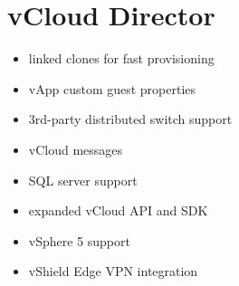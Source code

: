 \section{vCloud Director}

\begin{itemize}

\item linked clones for fast provisioning
\item vApp custom guest properties
\item 3rd-party distributed switch support
\item vCloud messages
\item SQL server support
\item expanded vCloud API and SDK
\item vSphere 5 support
\item vShield Edge VPN integration

\end{itemize}
